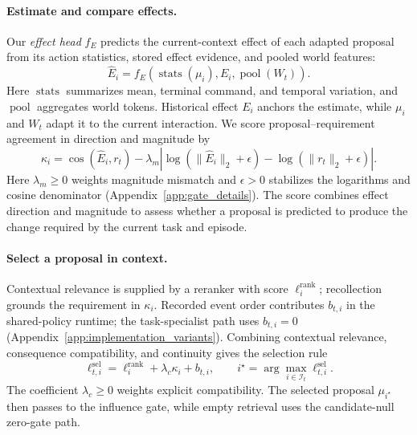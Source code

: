 \paragraph{Estimate and compare effects.}
Our \emph{effect head} $f_E$ predicts the current-context effect of each adapted proposal from its action statistics, stored effect evidence, and pooled world features:
\begin{equation}
 \widehat E_i=f_E\!\left(\operatorname{stats}(\mu_i),E_i,\operatorname{pool}(W_t)\right).
 \label{eq:effect}
\end{equation}
Here $\operatorname{stats}$ summarizes mean, terminal command, and temporal variation, and $\operatorname{pool}$ aggregates world tokens.
Historical effect $E_i$ anchors the estimate, while $\mu_i$ and $W_t$ adapt it to the current interaction.
We score proposal--requirement agreement in direction and magnitude by
\begin{equation}
 \kappa_i=\cos(\widehat E_i,r_t)-\lambda_m
 \left|\log(\|\widehat E_i\|_2+\epsilon)-\log(\|r_t\|_2+\epsilon)\right|.
 \label{eq:kappa}
\end{equation}
Here $\lambda_m\geq0$ weights magnitude mismatch and $\epsilon>0$ stabilizes the logarithms and cosine denominator (Appendix~\ref{app:gate_details}).
The score combines effect direction and magnitude to assess whether a proposal is predicted to produce the change required by the current task and episode.

\paragraph{Select a proposal in context.}
Contextual relevance is supplied by a reranker with score $\ell_i^{\mathrm{rank}}$; recollection grounds the requirement in $\kappa_i$. Recorded event order contributes $b_{t,i}$ in the shared-policy runtime; the task-specialist path uses $b_{t,i}=0$ (Appendix~\ref{app:implementation_variants}).
Combining contextual relevance, consequence compatibility, and continuity gives the selection rule
\begin{equation}
 \ell_{t,i}^{\mathrm{sel}}=\ell_i^{\mathrm{rank}}+\lambda_c\kappa_i+b_{t,i},\qquad
 i^\star=\arg\max_{i\in\mathcal I_t}\ell_{t,i}^{\mathrm{sel}}.
 \label{eq:selection}
\end{equation}
The coefficient $\lambda_c\geq0$ weights explicit compatibility.
The selected proposal $\mu_{i^\star}$ then passes to the influence gate, while empty retrieval uses the candidate-null zero-gate path.

